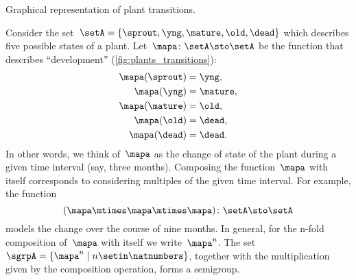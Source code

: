 \begin{marginfigure}
    \centering
    \caption{Graphical representation of plant transitions.}
    \label{fig:plants_transitions}
\end{marginfigure}

\begin{example}
    \label{exa:plant-trafo-semigroup}
    Consider the set~$\setA = \{ \sprout, \yng, \mature, \old, \dead \}$ which describes five possible states of a plant.
    Let~$\mapa \colon \setA \sto \setA$ be the function that describes ``development'' (\cref{fig:plants_transitions}):
    \begin{align*}
        \mapa(\sprout) & =  \yng, \\
        \mapa(\yng)    & =  \mature, \\
        \mapa(\mature) & =  \old, \\
        \mapa( \old)   & = \dead, \\
        \mapa (\dead)  & = \dead.
    \end{align*}
    In other words, we think of~$\mapa$ as the change of state of the plant during a given time interval (say, three months).
    Composing the function~$\mapa$ with itself corresponds to considering multiples of the given time interval.
    For example, the function
    \begin{equation*}
        (\mapa \mtimes \mapa \mtimes \mapa)
        \colon \setA \sto \setA
    \end{equation*}
    models the change over the course of nine months.
    In general, for the n-fold composition of~$\mapa$ with itself we write~$\mapa^n$.
    The set~$\sgrpA = \{ \mapa^n \mid n \setin \natnumbers \}$, together with the multiplication given by the composition operation, forms a semigroup.
\end{example}
%
